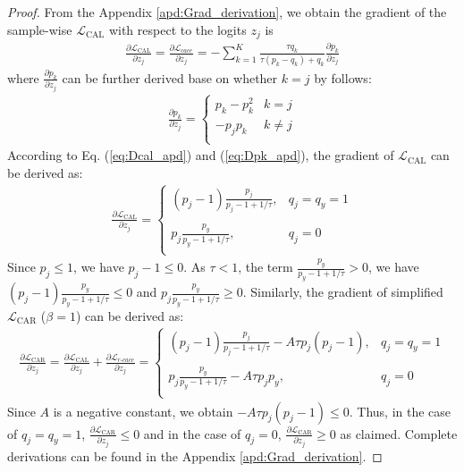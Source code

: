 \documentclass{article}
\begin{document}
\begin{proof} From the Appendix \ref{apd:Grad_derivation}, we obtain the gradient of the sample-wise $\mathcal{L}_\text{CAL}$ with respect to the logits $z_{j}$ is
	\begin{align}
		\label{eq:Dcal_apd}
		\frac{\partial \mathcal{L}_\text{CAL}}{\partial z_{j}}=\frac{\partial \mathcal{L}_{cace}}{\partial z_{j}}=-\sum_{k=1}^{K}\frac{\tau q_{k}}{\tau (p_{k}-q_{k})+q_{k}}\frac{\partial p_{k}}{\partial z_{j}}
	\end{align}
	where $\frac{\partial p_{k}}{\partial z_{j}}$ can be further derived base on whether $k=j$ by follows:
	\begin{align}
		\label{eq:Dpk_apd}
		\frac{\partial p_{k}}{\partial z_{j}}=\left\{ \begin{array}{ll}
			p_{k}-p_{k}^{2} & k=j\\
			-p_{j}p_{k} & k\ne j  \\
		\end{array} \right.
	\end{align}
	According to Eq. (\ref{eq:Dcal_apd}) and (\ref{eq:Dpk_apd}), the gradient of $\mathcal{L}_\textrm{CAL}$ can be derived as:
	\begin{align}
		\frac{\partial \mathcal{L}_\textrm{CAL}}{\partial z_{j}}=\left\{ \begin{array}{ll}
			(p_{j}-1)\frac{p_{j}}{p_{j}-1+1/\tau}, & q_{j}=q_{y}=1\\\\
			p_{j}\frac{p_{y}}{p_{y}-1+1/\tau}, & q_{j}=0  \\
		\end{array} \right.
	\end{align}
	Since $p_{j} \le 1$, we have $p_{j}-1 \le 0$. As $\tau < 1$, the term $\frac{p_{y}}{p_{y}-1 +1/\tau} >0 $, we have $(p_{j}-1)\frac{p_{y}}{p_{y}-1 +1/\tau} \le 0$ and $p_{j}\frac{p_{y}}{p_{y}-1 +1/\tau} \ge 0$. Similarly, the gradient of simplified $\mathcal{L}_\text{CAR}$ ($\beta=1$) can be derived as:
	\begin{align}
		\label{eq:Dcar_apd}
		\frac{\partial \mathcal{L}_\textrm{CAR}}{\partial z_{j}}=\frac{\partial \mathcal{L}_\textrm{CAL}}{\partial z_{j}}+\frac{\partial \mathcal{L}_{r\text{-}cace}}{\partial z_{j}}=\left\{ \begin{array}{ll}
			(p_{j}-1) \frac{ p_{j}}{p_{j}-1 +1/\tau}-A\tau p_{j}(p_{j}-1), & q_{j}=q_{y}=1\\\\
			p_{j}\frac{p_{y}}{p_{y}-1+1/\tau}-A\tau p_{j}p_{y} , & q_{j}=0  \\
		\end{array} \right.
	\end{align}
	Since $A$ is a negative constant, we obtain $-A\tau p_{j}(p_{j}-1) \le 0$. Thus, in the case of $q_{j}=q_{y}=1$, $\frac{\partial \mathcal{L}_\textrm{CAR}}{\partial z_{j}} \le 0$ and in the case of $q_{j}=0$, $\frac{\partial \mathcal{L}_\textrm{CAR}}{\partial z_{j}} \ge 0$ as claimed. Complete derivations can be found in the Appendix \ref{apd:Grad_derivation}.  
\end{proof}
\end{document}
